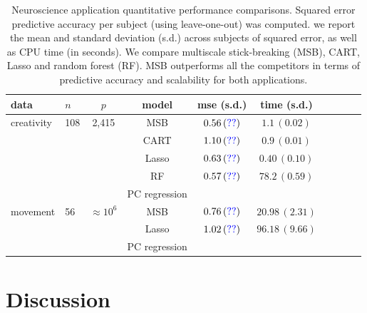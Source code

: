\documentclass{article} %
\newcommand{\dd}[1]{{\color{blue}{\it #1}}}
\begin{document}
\begin{table}[t]
\caption{Neuroscience application quantitative performance comparisons. Squared error predictive accuracy per subject (using leave-one-out) was computed. we report the mean and standard deviation (s.d.) across subjects of squared error, as well as CPU time (in seconds).
We compare multiscale stick-breaking (MSB), CART, Lasso and random forest (RF). MSB outperforms all the competitors in terms of predictive accuracy and scalability for both applications.}\label{real}
\vskip 0.15in
\begin{center}
\begin{small}
\begin{sc}
\begin{tabular}{llcccccccc}
\hline
data &$n$&$p$ &model&mse (s.d.) & time (s.d.) \\ %
\hline
creativity & 108 & 2,415 & MSB &$0.56 \, (\dd{??})$ &  $1.1 \, (0.02)$\\
 &&& CART & $1.10 \, (\dd{??}) $ &  $0.9 \, (0.01)$\\
&&& Lasso & $0.63 \, (\dd{??})$  &  $0.40 \, (0.10)$\\
&&& RF & $0.57 \, (\dd{??})$ &   $78.2 \, (0.59)$\\
&&& PC regression & \dd{??,  (??)} & \dd{?? , (??)}
\\
\hline
 movement & 56 & $\approx 10^6$& MSB &$0.76 \, (\dd{??})$  & $20.98 \, (2.31)$\\
 &&& Lasso & $1.02 \, (\dd{??})$ & $96.18 \, (9.66)$\\
&&& PC regression & \dd{??,  (??)} & \dd{?? , (??)}\\
\hline
\end{tabular}
\end{sc}
\end{small}
\end{center}
\vspace{-20pt}
\end{table}

\section{Discussion} \label{sec:disc}
\end{document}
